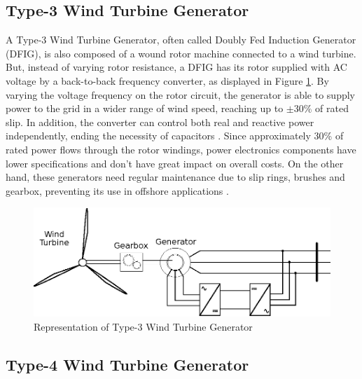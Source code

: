 \subsection{Type-3 Wind Turbine Generator}

A Type-3 Wind Turbine Generator, often called Doubly Fed Induction Generator (DFIG), is also composed of a wound rotor machine connected to a wind turbine. But, instead of varying rotor resistance, a DFIG has its rotor supplied with AC voltage by a back-to-back frequency converter, as displayed in Figure \ref{fig: WTG3}. By varying the voltage frequency on the rotor circuit, the generator is able to supply power to the grid in a wider range of wind speed, reaching up to $\pm 30\%$ of rated slip. In addition, the converter can control both real and reactive power independently, ending the necessity of capacitors \cite{Muljadi2010}. Since approximately 30\% of rated power flows through the rotor windings, power electronics components have lower specifications and don't have great impact on overall costs. On the other hand, these generators need regular maintenance due to slip rings, brushes and gearbox, preventing its use in offshore applications \cite{Yaramasu2015}.

\begin{figure}[h]
	\caption{Representation of Type-3 Wind Turbine Generator}
	\begin{center}
		\includegraphics[scale=1]{Images/Type3WTG.eps}
	\end{center}
	\label{fig: WTG3}
\end{figure}

\subsection{Type-4 Wind Turbine Generator}

